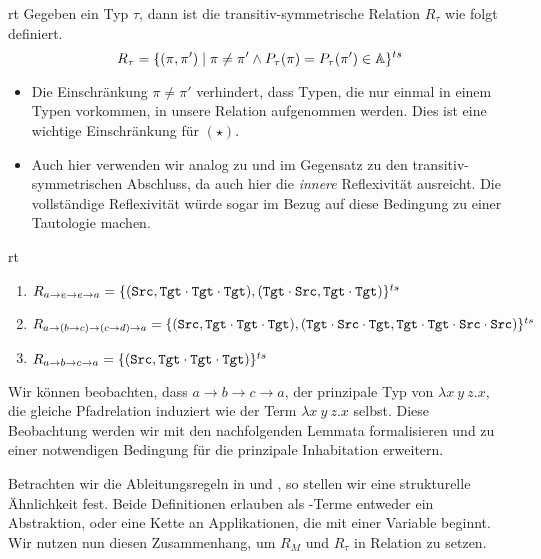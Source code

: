 \begin{definition}{}{rt}
    Gegeben ein Typ $\tau$, dann ist die transitiv-symmetrische Relation $R_\tau$ wie folgt definiert.
    \[R_\tau=\{(\pi,\pi')\mid \pi\neq\pi' \land P_\tau(\pi)=P_\tau(\pi')\in\mathbb{A}\}^{ts}\]
\end{definition}
\begin{remark}
    \begin{itemize}
        \item Die Einschränkung $\pi\neq\pi'$ verhindert, dass Typen, die nur einmal in einem Typen vorkommen, in unsere Relation aufgenommen werden. Dies ist eine wichtige Einschränkung für $(\star)$.
        \item Auch hier verwenden wir analog zu  und im Gegensatz zu \cite{dudenhefner} den transitiv-symmetrischen Abschluss, da auch hier die \emph{innere} Reflexivität ausreicht. Die vollständige Reflexivität würde sogar im Bezug auf  diese Bedingung zu einer Tautologie machen.
    \end{itemize}    
\end{remark}
\begin{example}{}{rt}
    \begin{enumerate}
        \item $R_{a\to e\to e\to a} = \{(\texttt{Src}, \texttt{Tgt}\cdot\texttt{Tgt}\cdot\texttt{Tgt}), (\texttt{Tgt}\cdot\texttt{Src}, \texttt{Tgt}\cdot\texttt{Tgt})\}^{ts}$
        \item $R_{a\to (b\to c)\to(c\to d)\to a} = \{(\texttt{Src}, \texttt{Tgt}\cdot\texttt{Tgt}\cdot\texttt{Tgt}),(\texttt{Tgt}\cdot\texttt{Src}\cdot\texttt{Tgt},\texttt{Tgt}\cdot\texttt{Tgt}\cdot\texttt{Src}\cdot\texttt{Src})\}^{ts}$
        \item $R_{a\to b\to c\to a} = \{(\texttt{Src}, \texttt{Tgt}\cdot\texttt{Tgt}\cdot\texttt{Tgt})\}^{ts}$
    \end{enumerate}
\end{example}

Wir können beobachten, dass $a\to b\to c\to a$, der prinzipale Typ von $\lambda x~y~z.x$, die gleiche Pfadrelation induziert wie der Term $\lambda x~y~z.x$ selbst. Diese Beobachtung werden wir mit den nachfolgenden Lemmata formalisieren und zu einer notwendigen Bedingung für die prinzipale Inhabitation erweitern.

Betrachten wir die Ableitungsregeln in  und , so stellen wir eine strukturelle Ähnlichkeit fest. Beide Definitionen erlauben als \tlambda-Terme entweder ein Abstraktion, oder eine Kette an Applikationen, die mit einer Variable beginnt. Wir nutzen nun diesen Zusammenhang, um $R_M$ und $R_\tau$ in Relation zu setzen.

